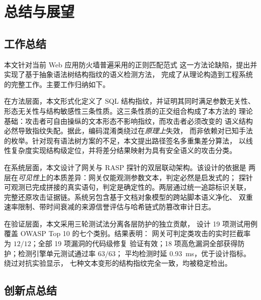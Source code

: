 \section{总结与展望}
\label{sec:conclusion}

\subsection{工作总结}

本文针对当前 Web 应用防火墙普遍采用的正则匹配范式
这一方法论缺陷，提出并实现了基于抽象语法树结构指纹的语义检测方法，
完成了从理论构造到工程系统的完整工作。主要工作归纳如下。

在方法层面，本文形式化定义了 SQL 结构指纹，并证明其同时满足参数无关性、
形态无关性与结构敏感性三条性质。这三条性质的正交组合构成了本方法的
理论基础：攻击者可自由操纵的文本形态不影响指纹，而攻击者必须改变的
语义结构必然导致指纹失配。据此，编码混淆类绕过在\emph{原理上}失效，
而非依赖对已知手法的枚举。针对现有语法树方案的不足，本文提出路径签名多重集差分算法，
以线性复杂度实现结构级定位，并将差分结果映射为具有安全语义的攻击分类。

在系统层面，本文设计了网关与 RASP 探针的双层联动架构。该设计的依据是
两层在\emph{可见性}上的本质差异：网关仅能观测参数文本，判定必然是启发式的；
探针可观测已完成拼接的真实语句，判定是确定性的。两层通过统一追踪标识关联，
完整还原攻击证据链。系统另包含基于文档对象模型的跨站脚本语义净化、
双重速率限制、带时间衰减的来源信誉评估与哈希链式防篡改审计日志。

在验证层面，本文采用三轮测试法分离各层防护的独立贡献，
设计 19 项测试用例覆盖 OWASP Top 10 的七个类别。结果表明：
网关可判定类攻击的实时拦截率为 $12/12$；全部 19 项漏洞的代码级修复
验证有效；18 项高危漏洞全部获得防护；检测引擎单元测试通过率 $63/63$；
平均检测时延 0.93~ms，优于设计指标。绕过对抗实验显示，
七种文本变形的结构指纹完全一致，均被稳定检出。

\subsection{创新点总结}

